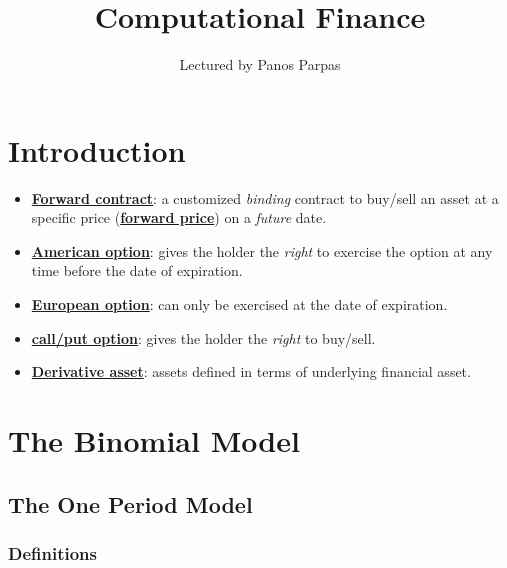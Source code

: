 \documentclass[twocolumn,landscape,10pt]{article}
\author{Lectured by Panos Parpas}
\title{Computational Finance}
\affil{Typed by Aris Zhu Yi Qing}
\theoremstyle{definition}
\begin{document}
\maketitle
\tableofcontents

\newpage

\section{Introduction}

\begin{itemize}
    \item \textbf{\underline{Forward contract}}: a customized \emph{binding} 
        contract to buy/sell an asset at a specific price 
        (\textbf{\underline{forward price}}) on a \emph{future} date.
    \item \textbf{\underline{American option}}: gives the holder the
        \emph{right} to exercise the option at any time before the
        date of expiration.
    \item \textbf{\underline{European option}}: can only be exercised
        at the date of expiration.
    \item \textbf{\underline{call/put option}}: gives the holder the
        \emph{right} to buy/sell.
        \textbf{\underline{}}
    \item \textbf{\underline{Derivative asset}}: assets defined in terms of
        underlying financial asset.
\end{itemize} 

\section{The Binomial Model}

\subsection{The One Period Model}

\subsubsection{Definitions}
\end{document}
